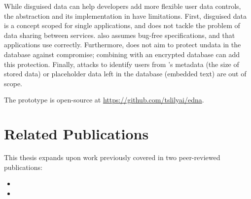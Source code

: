 %
While disguised data can help developers add more flexible user data
controls, the abstraction and its implementation in \sys have limitations. 
%
First, disguised data is a concept scoped for single applications, and does not
tackle the problem of data sharing between services.
%
%
\sys also assumes bug-free \xx specifications, and that applications use \sys
correctly.
%
Furthermore, \sys does not aim to protect un\xxed data in the database against compromise;
combining \sys with an encrypted database can add this protection.
%
Finally, attacks to identify users from \sys's metadata (\eg the size of
stored \xxed data) or placeholder data left in the database (\eg embedded text)
are out of scope.
%

The \sys prototype is open-source at \url{https://github.com/tslilyai/edna}.

\section{Related Publications}
This thesis expands upon work previously covered in two
peer-reviewed publications:

\begin{itemize}
    \item {}
    \item {}
\end{itemize}
%

\iffalse
\section{Remaining Work: Revealing with Schema Migrations and Application
Updates}

In \sys's current design, \textbf{global database updates} that implicitly enforce
invariants on application data remain unknown (and thus uncheckable) by \sys.
\sys also fails to reveal disguised data affected by \textbf{schema migrations}
performed since the time of disguise.
%
We will add an API for developers to log important updates and schema migrations with \sys, which \sys will apply to disguised data prior to restoring it to the database.

\sys will apply these updates or schema migrations prior to performing \sys's
existing consistency checks; these checks enable \sys to detect if revealing
transformations will violate referential integrity or other structural database
invariants (\eg uniqueness requirements). 

\fi

